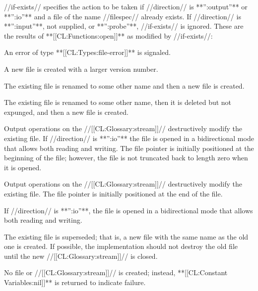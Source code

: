 
//if-exists// specifies the action to be taken if //direction// is **'':output''** or **'':io''** and a file of the name //filespec// already exists. If //direction// is **'':input''**, not supplied, or **'':probe''**, //if-exists// is ignored. These are the results of **[[CL:Functions:open]]** as modified by //if-exists//:

\beginlist


An error of type **[[CL:Types:file-error]]** is signaled.


A new file is created with a larger version number.


The existing file is renamed to some other name and then a new file is created.


The existing file is renamed to some other name, then it is deleted but not expunged, and then a new file is created.


Output operations on the //[[CL:Glossary:stream]]// destructively modify the existing file. If //direction// is **'':io''** the file is opened in a bidirectional mode that allows both reading and writing. The file pointer is initially positioned at the beginning of the file; however, the file is not truncated back to length zero when it is opened.


Output operations on the //[[CL:Glossary:stream]]// destructively modify the existing file. The file pointer is initially positioned at the end of the file.

If //direction// is **'':io''**, the file is opened in a bidirectional mode that allows both reading and writing.


The existing file is superseded; that is, a new file with the same name as the old one is created. If possible, the implementation should not destroy the old file until the new //[[CL:Glossary:stream]]// is closed.


No file or //[[CL:Glossary:stream]]// is created; instead, **[[CL:Constant Variables:nil]]** is returned to indicate failure.

